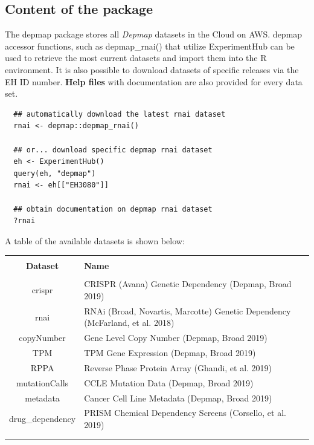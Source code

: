 \documentclass{article}
\newcommand{\hcode}[2][lgray]{{\ttfamily\color{vdgray}\colorbox{#1}{#2}}}
\begin{document}
\begin{multicols}{2}
\noindent
\begin{minipage}[t]{\linewidth}
  \vspace{0.55cm}
  \section*{\huge Content of the package}
  \large The \hcode{depmap} package stores all \textit{Depmap} datasets \nocite{meyers2017computational} in the Cloud on AWS. \hcode{depmap} accessor functions, such as \hcode{depmap\_rnai()} that utilize \hcode{ExperimentHub} can be used to retrieve the most current datasets and import them into the R environment. It is also possible to download datasets of specific releases via the \hcode{EH} ID number. \textbf{Help files} with documentation are also provided for every data set.
    \vspace{0.4cm}
    \begin{lstlisting}
  ## automatically download the latest rnai dataset
  rnai <- depmap::depmap_rnai()

  ## or... download specific depmap rnai dataset
  eh <- ExperimentHub()
  query(eh, "depmap")
  rnai <- eh[["EH3080"]]

  ## obtain documentation on depmap rnai dataset
  ?rnai
  \end{lstlisting}
    \vspace{0.4cm}
  \large A table of the available datasets is shown below:
  
  \scriptsize
  \begin{tabular}{@{\extracolsep{5pt}} cl}
  \vspace{0.4cm}
    \\[-1.8ex]\hline
    \hline \\[-1.8ex]
    \textbf{Dataset} & \textbf{Name} \\
    \hline \\[-1.8ex]
    crispr & CRISPR (Avana) Genetic Dependency (Depmap, Broad 2019) \\
    rnai & RNAi (Broad, Novartis, Marcotte) Genetic Dependency (McFarland, et al. 2018) \\
    copyNumber & Gene Level Copy Number (Depmap, Broad 2019) \\
    TPM & TPM Gene Expression (Depmap, Broad 2019) \\
    RPPA & Reverse Phase Protein Array (Ghandi, et al. 2019) \\
    mutationCalls & CCLE Mutation Data (Depmap, Broad 2019) \\
    metadata & Cancer Cell Line Metadata (Depmap, Broad 2019) \\
    drug\_dependency & PRISM Chemical Dependency Screens (Corsello, et al. 2019) \\
    \hline \\[-1.8ex]
    \vspace{0.25cm}
  \end{tabular}
  

\end{minipage}
\end{multicols}
\end{document}
